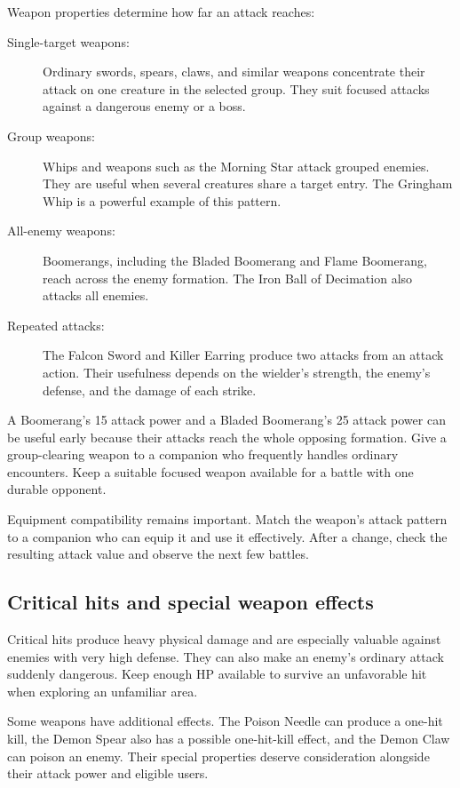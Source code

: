 Weapon properties determine how far an attack reaches:
\begin{description}
  \item[Single-target weapons:] Ordinary swords, spears, claws, and similar
    weapons concentrate their attack on one creature in the selected group.
    They suit focused attacks against a dangerous enemy or a boss.
  \item[Group weapons:] Whips and weapons such as the Morning Star attack
    grouped enemies. They are useful when several creatures share a target
    entry. The Gringham Whip is a powerful example of this pattern.
  \item[All-enemy weapons:] Boomerangs, including the Bladed Boomerang and
    Flame Boomerang, reach across the enemy formation. The Iron Ball of
    Decimation also attacks all enemies.
  \item[Repeated attacks:] The Falcon Sword and Killer Earring produce
    two attacks from an attack action. Their usefulness depends on the
    wielder's strength, the enemy's defense, and the damage of each strike.
\end{description}

A Boomerang's 15 attack power and a Bladed Boomerang's 25 attack power can
be useful early because their attacks reach the whole opposing formation.
Give a group-clearing weapon to a companion who frequently handles ordinary
encounters. Keep a suitable focused weapon available for a battle with
one durable opponent.

Equipment compatibility remains important. Match the weapon's attack
pattern to a companion who can equip it and use it effectively. After a
change, check the resulting attack value and observe the next few battles.

\subsection*{Critical hits and special weapon effects}

Critical hits produce heavy physical damage and are especially valuable
against enemies with very high defense. They can also make an enemy's
ordinary attack suddenly dangerous. Keep enough HP available to survive
an unfavorable hit when exploring an unfamiliar area.

Some weapons have additional effects. The Poison Needle can produce a
one-hit kill, the Demon Spear also has a possible one-hit-kill effect,
and the Demon Claw can poison an enemy. Their special properties deserve
consideration alongside their attack power and eligible users.

